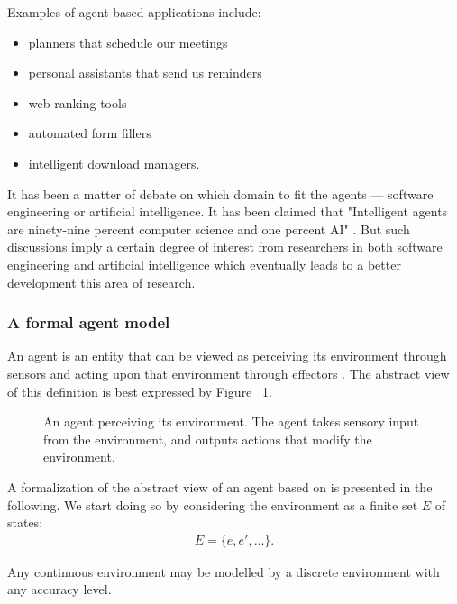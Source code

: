 Examples of agent based applications include:
\begin{itemize}
\item planners that schedule our meetings
\item personal assistants that send us reminders 
\item web ranking tools 
\item automated form fillers 
\item intelligent download managers. 
\end{itemize}

It has been a matter of debate on which domain to fit the agents --- software engineering or artificial intelligence. It has been claimed that "Intelligent agents are ninety-nine percent computer science and one percent AI" \cite{Etzioni96Moving}. But such discussions imply a certain degree of interest from researchers in both software engineering and artificial intelligence which eventually leads to a better development this area of research.

\subsubsection{A formal agent model}

An agent is an entity that can be viewed as perceiving its environment through sensors and acting upon that environment through effectors \cite{Serban04Tehnici}. The abstract view of this definition is best expressed by Figure ~\ref{fig:agent}.

\begin{figure}[h!]
\centerline{}
      \caption[An agent perceiving its environment]{An agent perceiving its environment. The agent takes sensory input from the environment, and outputs actions that modify the environment.}
\label{fig:agent}
\end{figure}

A formalization of the abstract view of an agent based on \cite{Wooldridge09AnIntroduction} is presented in the following. We start doing so by considering  the environment as a finite set $E$ of states:
\begin{align}
	E=\{e, e',  \ldots\}.
\end{align}

\begin{remark}
Any continuous environment may be modelled by a discrete environment with any accuracy level.
\end{remark}

